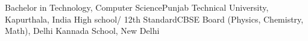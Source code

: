 %
%
%


\begin{scholarship}
					{Bachelor in Technology, Computer Science}{Punjab Technical University, Kapurthala, India}
					{High school/ 12th Standard}{CBSE Board (Physics, Chemistry, Math), Delhi Kannada School, New Delhi}
\end{scholarship}